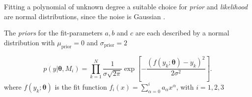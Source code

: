 \documentclass[11pt,aspectratio=1610,dvipsnames]{beamer}
\newcommand{\btheta}{\boldsymbol{\theta}}
\begin{document}
\begin{frame}{Fitting a polynomial of unknown degree}
	a suitable choice for \emph{prior} and \emph{likelihood} are normal distributions, since the noise is Gaussian \citet{sivia}.
		\begin{tcolorbox}[colback=black!5,colframe=gray!15!black,title=Choosing a prior]
		The \emph{priors} for the fit-parameters $a,b$ and $c$  are each described by a normal distribution with $\mu_{\text{prior}}=0$ and $\sigma_{\text{prior}}=2$
	\end{tcolorbox}

		\begin{tcolorbox}[colback=black!5,colframe=gray!15!black,title=Choosing a likelihood]
			$$p(y|\btheta, M_i)=\prod_{k=1}^{N}\frac{1}{\sigma\sqrt{2\pi}}\exp{\left[-\frac{(f(y_k;\btheta)-y_k)^2}{2\sigma^2}\right]}.$$
			where $f(y_k;\btheta)$ is the fit function $f_i(x)=\displaystyle\sum_{\alpha=0}^{i}a_\alpha x^\alpha$, with $i=1,2,3$
	\end{tcolorbox}
\end{frame}
\end{document}
